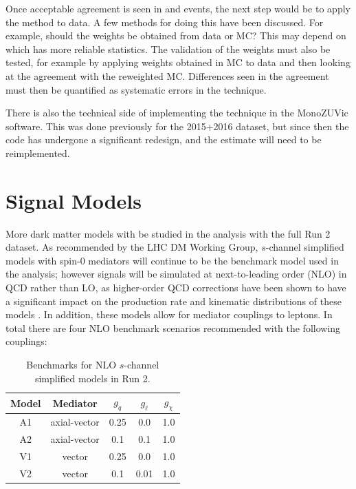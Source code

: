 Once acceptable agreement is seen in \gjets and \Zjets events, the next step would be to apply the method to data. A few methods for doing this have been discussed. For example, should the weights be obtained from data or MC? This may depend on which has more reliable statistics. The validation of the weights must also be tested, for example by applying weights obtained in MC to data and then looking at the agreement with the reweighted MC. Differences seen in the agreement must then be quantified as systematic errors in the technique. 

There is also the technical side of implementing the \gjets technique in the MonoZUVic software. This was done previously for the 2015+2016 dataset, but since then the code has undergone a significant redesign, and the \gjets estimate will need to be reimplemented.

\section{Signal Models}

More dark matter models with be studied in the \monoZ analysis with the full Run 2 dataset. As recommended by the LHC DM Working Group, $s$-channel simplified models with spin-0 mediators will continue to be the benchmark model used in the analysis; however signals will be simulated at next-to-leading order (NLO) in QCD rather than LO, as higher-order QCD corrections have been shown to have a significant impact on the production rate and kinematic distributions of these models \cite{Backovic:2015soa}. In addition, these models allow for mediator couplings to leptons. In total there are four NLO benchmark scenarios recommended \cite{Albert:2017onk} with the following couplings:

\begin{table}[h]
\centering
\begin{tabular}{ccccc}
\hline \hline
Model & Mediator     & $g_q$ & $g_\ell$ & $g_\chi$ \\ \hline \hline
A1    & axial-vector & 0.25  & 0.0      & 1.0      \\ \hline
A2    & axial-vector & 0.1   & 0.1      & 1.0      \\ \hline
V1    & vector       & 0.25  & 0.0      & 1.0      \\ \hline
V2    & vector       & 0.1   & 0.01     & 1.0    \\ \hline \hline
\end{tabular}
\caption{Benchmarks for NLO $s$-channel simplified models in Run 2.}
\label{tbl:nloSimp}
\end{table}

